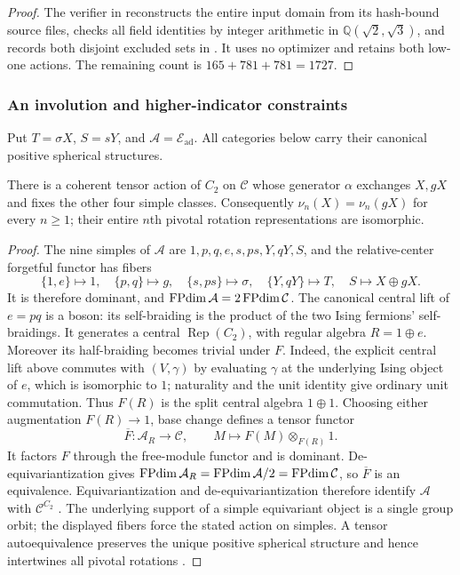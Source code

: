 \begin{proof}
The verifier  in
 reconstructs the entire input domain
from its hash-bound source files, checks all field identities by integer
arithmetic in $\mathbb Q(\sqrt2,\sqrt3)$, and records both disjoint
excluded sets in .
It uses no optimizer and retains both low-one actions. The remaining count is
$165+781+781=1727$.
\end{proof}

\subsubsection{An involution and higher-indicator constraints}

Put $T=\sigma X$, $S=sY$, and
$\mathcal A=\mathcal E_{\mathrm{ad}}$.
All categories below carry their canonical positive spherical structures.

\begin{proposition}\label{prop:1660-tensor-involution}
There is a coherent tensor action of $C_2$ on $\mathcal C$ whose generator
$\alpha$ exchanges $X,gX$ and fixes the other four simple classes.
Consequently $\nu_n(X)=\nu_n(gX)$ for every $n\geq1$; their entire
$n$th pivotal rotation representations are isomorphic.
\end{proposition}
\begin{proof}
The nine simples of $\mathcal A$ are $1,p,q,e,s,ps,Y,qY,S$, and the
relative-center forgetful functor has fibers
\[
 \{1,e\}\mapsto1,\quad\{p,q\}\mapsto g,\quad
 \{s,ps\}\mapsto\sigma,\quad\{Y,qY\}\mapsto T,\quad
 S\mapsto X\oplus gX.
\]
It is therefore dominant, and $\operatorname{FPdim}\mathcal A=2\operatorname{FPdim}\mathcal C$.
The canonical central lift of $e=pq$ is a boson: its self-braiding is
the product of the two Ising fermions' self-braidings. It generates a
central $\operatorname{Rep}(C_2)$, with regular algebra $R=1\oplus e$.
Moreover its half-braiding becomes trivial under $F$. Indeed, the
explicit central lift above commutes with $(V,\gamma)$ by evaluating
$\gamma$ at the underlying Ising object of $e$, which is isomorphic
to $1$; naturality and the unit identity give ordinary unit commutation.
Thus $F(R)$ is the split central algebra $1\oplus1$. Choosing either
augmentation $F(R)\to1$, base change defines a tensor functor
\[
 \overline F:\mathcal A_R\longrightarrow\mathcal C,
 \qquad M\longmapsto F(M)\otimes_{F(R)}1.
\]
It factors $F$ through the free-module functor and is dominant.
De-equivariantization gives
$\operatorname{FPdim}\mathcal A_R=\operatorname{FPdim}\mathcal A/2=\operatorname{FPdim}\mathcal C$,
so $\overline F$ is an equivalence. Equivariantization and
de-equivariantization therefore identify $\mathcal A$ with
$\mathcal C^{C_2}$ \cite[Section~4.2, especially Theorem~4.18 and
Proposition~4.26]{DGNO}. The underlying support of a simple equivariant
object is a single group orbit; the displayed fibers force the stated
action on simples. A tensor autoequivalence preserves the unique positive
spherical structure and hence intertwines all pivotal rotations
\cite{NSpiv}.
\end{proof}

